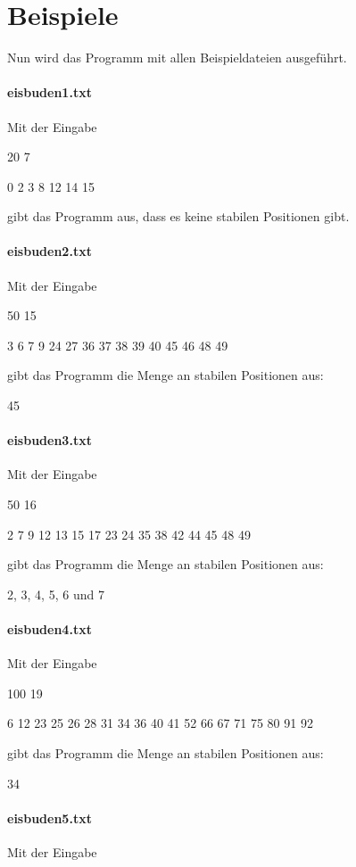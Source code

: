 \documentclass[a4paper,10pt,ngerman]{scrartcl}
\begin{document}
\section{Beispiele}
Nun wird das Programm mit allen Beispieldateien ausgeführt.

\paragraph{eisbuden1.txt}
Mit der Eingabe

20 7

0 2 3 8 12 14 15

gibt das Programm aus, dass es keine stabilen Positionen gibt.

\paragraph{eisbuden2.txt}
Mit der Eingabe

50 15

3 6 7 9 24 27 36 37 38 39 40 45 46 48 49

gibt das Programm die Menge an stabilen Positionen aus:

45

\paragraph{eisbuden3.txt}
Mit der Eingabe

50 16

2 7 9 12 13 15 17 23 24 35 38 42 44 45 48 49

gibt das Programm die Menge an stabilen Positionen aus:

2, 3, 4, 5, 6 und 7

\paragraph{eisbuden4.txt}
Mit der Eingabe

100 19

6 12 23 25 26 28 31 34 36 40 41 52 66 67 71 75 80 91 92

gibt das Programm die Menge an stabilen Positionen aus:

34

\paragraph{eisbuden5.txt}
Mit der Eingabe
\end{document}
